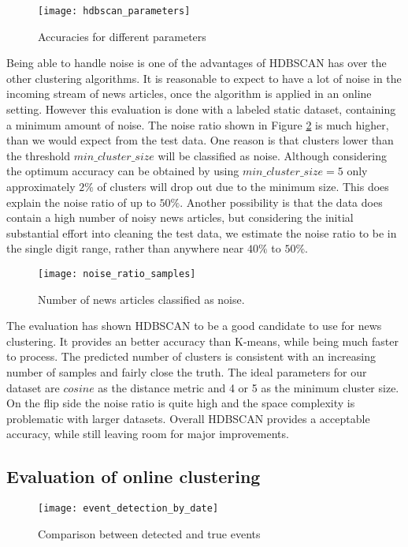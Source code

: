 \begin{figure}[h]
    \centering
    \texttt{[image: hdbscan\_parameters]}
    \caption{Accuracies for different parameters}
    \label{fig:hdbscan_parameters}
\end{figure}


Being able to handle noise is one of the advantages of HDBSCAN has over the other clustering algorithms. It is reasonable to expect to have a lot of noise in the incoming stream of news articles, once the algorithm is applied in an online setting. However this evaluation is done with a labeled static dataset, containing a minimum amount of noise. The noise ratio shown in Figure \ref{fig:noise_ratio_samples} is much higher, than we would expect from the test data. One reason is that clusters lower than the threshold $min\_cluster\_size$ will be classified as noise. Although considering the optimum accuracy can be obtained by using $min\_cluster\_size=5$ only approximately $2\%$ of clusters will drop out due to the minimum size. This does explain the noise ratio of up to $50\%$. Another possibility is that the data does contain a high number of noisy news articles, but considering the initial substantial effort into cleaning the test data, we estimate the noise ratio to be in the single digit range, rather than anywhere near $40\%$ to $50\%$. 


\begin{figure}[h]
    \centering
    \texttt{[image: noise\_ratio\_samples]}
    \caption{Number of news articles classified as noise.}
    \label{fig:noise_ratio_samples}
\end{figure}


The evaluation has shown HDBSCAN to be a good candidate to use for news clustering. It provides an better accuracy than K-means, while being much faster to process. The predicted number of clusters is consistent with an increasing number of samples and fairly close the truth. The ideal parameters for our dataset are $cosine$ as the distance metric and 4 or 5 as the minimum cluster size. On the flip side the noise ratio is quite high and the space complexity is problematic with larger datasets. Overall HDBSCAN provides a acceptable accuracy, while still leaving room for major improvements.

\subsection{Evaluation of online clustering}

\begin{figure}[h]
    \centering
    \texttt{[image: event\_detection\_by\_date]}
    \caption{Comparison between detected and true events}
    \label{fig:event_detection_by_date}
\end{figure}

